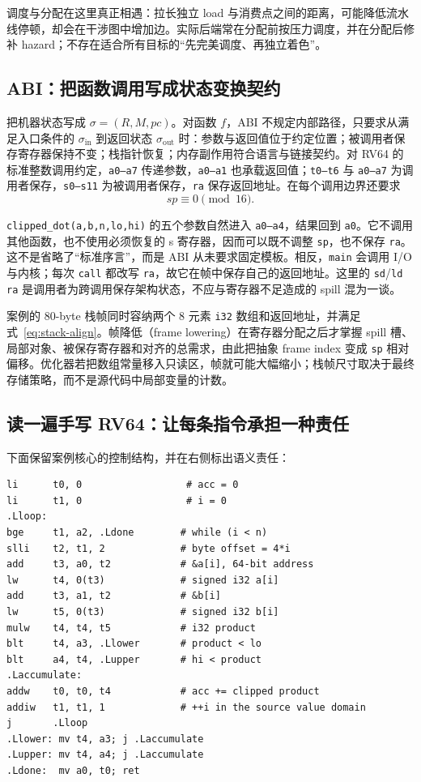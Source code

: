 调度与分配在这里真正相遇：拉长独立 load 与消费点之间的距离，可能降低流水线停顿，却会在干涉图中增加边。实际后端常在分配前按压力调度，并在分配后修补 hazard；不存在适合所有目标的“先完美调度、再独立着色”。

\subsection{ABI：把函数调用写成状态变换契约}

把机器状态写成 $\sigma=(R,M,pc)$。对函数 $f$，ABI 不规定内部路径，只要求从满足入口条件的 $\sigma_{\mathrm{in}}$ 到返回状态 $\sigma_{\mathrm{out}}$ 时：参数与返回值位于约定位置；被调用者保存寄存器保持不变；栈指针恢复；内存副作用符合语言与链接契约。对 RV64 的标准整数调用约定，\texttt{a0--a7} 传递参数，\texttt{a0--a1} 也承载返回值；\texttt{t0--t6} 与 \texttt{a0--a7} 为调用者保存，\texttt{s0--s11} 为被调用者保存，\texttt{ra} 保存返回地址\cite{bin-riscv-psabi}。在每个调用边界还要求
\begin{equation}
  sp\equiv 0\pmod {16}.
  \label{eq:stack-align}
\end{equation}

\texttt{clipped\_dot(a,b,n,lo,hi)} 的五个参数自然进入 \texttt{a0--a4}，结果回到 \texttt{a0}。它不调用其他函数，也不使用必须恢复的 s 寄存器，因而可以既不调整 \texttt{sp}，也不保存 \texttt{ra}。这不是省略了“标准序言”，而是 ABI 从未要求固定模板。相反，\texttt{main} 会调用 I/O 与内核；每次 \texttt{call} 都改写 \texttt{ra}，故它在帧中保存自己的返回地址。这里的 \texttt{sd}/\texttt{ld ra} 是调用者为跨调用保存架构状态，不应与寄存器不足造成的 spill 混为一谈。

案例的 80-byte 栈帧同时容纳两个 8 元素 \texttt{i32} 数组和返回地址，并满足式~\ref{eq:stack-align}。帧降低（frame lowering）在寄存器分配之后才掌握 spill 槽、局部对象、被保存寄存器和对齐的总需求，由此把抽象 frame index 变成 \texttt{sp} 相对偏移。优化器若把数组常量移入只读区，帧就可能大幅缩小；栈帧尺寸取决于最终存储策略，而不是源代码中局部变量的计数。

\subsection{读一遍手写 RV64：让每条指令承担一种责任}

下面保留案例核心的控制结构，并在右侧标出语义责任：

\begin{lstlisting}[language=RISCV,basicstyle=\ttfamily\scriptsize]
li      t0, 0                  # acc = 0
li      t1, 0                  # i = 0
.Lloop:
bge     t1, a2, .Ldone        # while (i < n)
slli    t2, t1, 2             # byte offset = 4*i
add     t3, a0, t2            # &a[i], 64-bit address
lw      t4, 0(t3)             # signed i32 a[i]
add     t3, a1, t2            # &b[i]
lw      t5, 0(t3)             # signed i32 b[i]
mulw    t4, t4, t5            # i32 product
blt     t4, a3, .Llower       # product < lo
blt     a4, t4, .Lupper       # hi < product
.Laccumulate:
addw    t0, t0, t4            # acc += clipped product
addiw   t1, t1, 1             # ++i in the source value domain
j       .Lloop
.Llower: mv t4, a3; j .Laccumulate
.Lupper: mv t4, a4; j .Laccumulate
.Ldone:  mv a0, t0; ret
\end{lstlisting}

